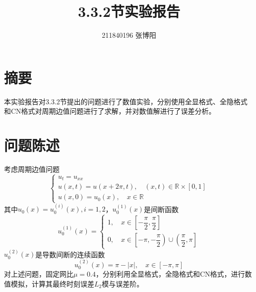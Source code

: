 \documentclass[UTF8,a4paper,10pt]{ctexart}
\title{\textbf{3.3.2节实验报告}}
\author{ 211840196 张博阳 }
\date{}
\begin{document}
\maketitle

\section*{摘要}
\par
本实验报告对3.3.2节提出的问题进行了数值实验，分别使用全显格式、全隐格式和CN格式对周期边值问题进行了求解，并对数值解进行了误差分析。

\section{问题陈述}
考虑周期边值问题
$$
    \begin{cases}
        u_t = u_{xx}                                                      \\
        u(x, t) = u(x + 2 \pi, t),\quad (x,t) \in \mathbb{R} \times [0,1] \\
        u(x, 0) = u_0(x),\quad x \in \mathbb{R}
    \end{cases}
$$
其中$u_0(x) = u_0^{(i)}(x), i=1, 2$，$u_0^{(1)}(x)$是间断函数
$$
    u_0^{(1)}(x) =
    \begin{cases}
        1,\quad x \in \left[ -\dfrac{\pi}{2}, \dfrac{\pi}{2} \right] \\
        0,\quad x \in \left[ -\pi, -\dfrac{\pi}{2} \right) \cup \left( \dfrac{\pi}{2}, \pi \right]
    \end{cases}
$$
$u_0^{(2)}(x)$是导数间断的连续函数
$$
    u_0^{(2)}(x) = \pi - \left| x \right|,\quad x \in \left[ -\pi,\pi \right]
$$
对上述问题，固定网比$\mu = 0.4$，分别利用全显格式，全隐格式和CN格式，进行数值模拟，计算其最终时刻误差$L_2$模与误差阶。
\end{document}
